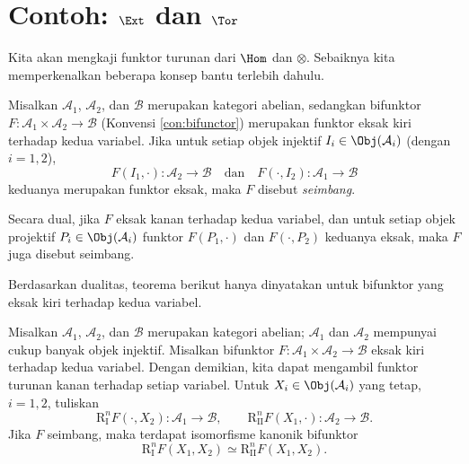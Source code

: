 
\section{Contoh: \texorpdfstring{$\Ext$}{Ext} dan \texorpdfstring{$\Tor$}{Tor}}\label{sec:Ext-Tor}
\hypertarget{o014.aljabr2.chapter3.ext-tor}{ }

Kita akan mengkaji funktor turunan dari $\Hom$ dan $\otimes$. Sebaiknya kita
memperkenalkan beberapa konsep bantu terlebih dahulu.

\begin{definisi}\label{def:balanced-functor}
Misalkan $\mathcal{A}_1$, $\mathcal{A}_2$, dan $\mathcal{B}$ merupakan
kategori abelian, sedangkan bifunktor $F: \mathcal{A}_1 \times \mathcal{A}_2
\to \mathcal{B}$ (Konvensi \ref{con:bifunctor}) merupakan funktor eksak kiri
terhadap kedua variabel. Jika untuk setiap objek injektif $I_i \in
\Obj(\mathcal{A}_i)$ (dengan $i=1,2$),
\[
F(I_1, \cdot): \mathcal{A}_2 \to \mathcal{B} \quad\text{dan}\quad
F(\cdot, I_2): \mathcal{A}_1 \to \mathcal{B}
\]
keduanya merupakan funktor eksak, maka $F$ disebut \emph{seimbang}.

Secara dual, jika $F$ eksak kanan terhadap kedua variabel, dan untuk setiap
objek projektif $P_i \in \Obj(\mathcal{A}_i)$ funktor $F(P_1,\cdot)$ dan
$F(\cdot,P_2)$ keduanya eksak, maka $F$ juga disebut seimbang.
\end{definisi}

Berdasarkan dualitas, teorema berikut hanya dinyatakan untuk bifunktor yang
eksak kiri terhadap kedua variabel.

\begin{teorema}\label{prop:balanced-primer}
Misalkan $\mathcal{A}_1$, $\mathcal{A}_2$, dan $\mathcal{B}$ merupakan
kategori abelian; $\mathcal{A}_1$ dan $\mathcal{A}_2$ mempunyai cukup banyak
objek injektif. Misalkan bifunktor $F: \mathcal{A}_1\times\mathcal{A}_2\to
\mathcal{B}$ eksak kiri terhadap kedua variabel. Dengan demikian, kita dapat
mengambil funktor turunan kanan terhadap setiap variabel. Untuk $X_i \in
\Obj(\mathcal{A}_i)$ yang tetap, $i=1,2$, tuliskan
\[
\mathrm{R}_{\mathrm{I}}^n F(\cdot,X_2):\mathcal{A}_1\to\mathcal{B},\qquad
\mathrm{R}_{\mathrm{II}}^n F(X_1,\cdot):\mathcal{A}_2\to\mathcal{B}.
\]
Jika $F$ seimbang, maka terdapat isomorfisme kanonik bifunktor
\[
\mathrm{R}_{\mathrm{I}}^nF(X_1,X_2)\simeq
\mathrm{R}_{\mathrm{II}}^nF(X_1,X_2).
\]
\end{teorema}

